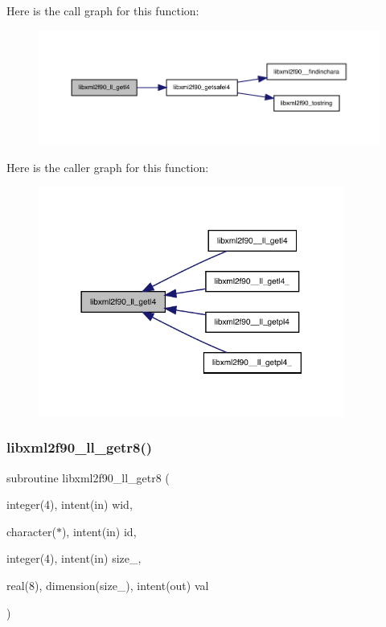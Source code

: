 Here is the call graph for this function\+:
\nopagebreak
\begin{figure}[H]
\begin{center}
\leavevmode
\includegraphics[width=350pt]{libxml2f90_8f90__pp_8f90_a71e6fc3f5a24b380986614bd6ff2ca9a_cgraph}
\end{center}
\end{figure}
Here is the caller graph for this function\+:
\nopagebreak
\begin{figure}[H]
\begin{center}
\leavevmode
\includegraphics[width=285pt]{libxml2f90_8f90__pp_8f90_a71e6fc3f5a24b380986614bd6ff2ca9a_icgraph}
\end{center}
\end{figure}
\mbox{\label{libxml2f90_8f90__pp_8f90_abf76069613613425c0bc9539a51cd4d9}} 
\subsubsection{\texorpdfstring{libxml2f90\+\_\+ll\+\_\+getr8()}{libxml2f90\_ll\_getr8()}}
{\footnotesize\ttfamily subroutine libxml2f90\+\_\+ll\+\_\+getr8 (\begin{DoxyParamCaption}\item[{integer(4), intent(in)}]{wid,  }\item[{character($\ast$), intent(in)}]{id,  }\item[{integer(4), intent(in)}]{size\+\_\+,  }\item[{real(8), dimension(size\+\_\+), intent(out)}]{val }\end{DoxyParamCaption})}

